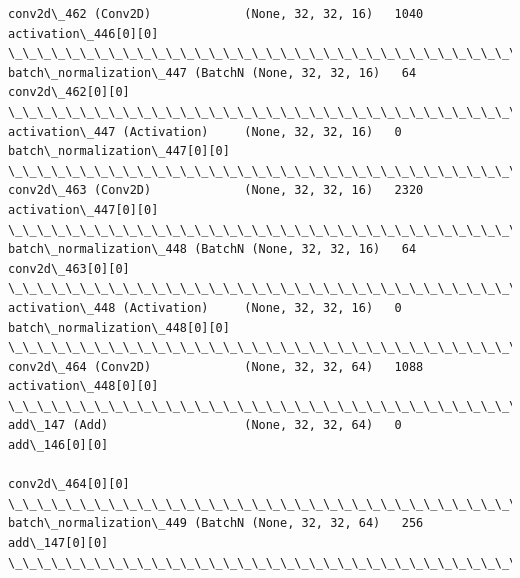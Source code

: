 \documentclass[11pt]{article}
\begin{document}
\begin{Verbatim}[commandchars=\\\{\}]
conv2d\_462 (Conv2D)             (None, 32, 32, 16)   1040        activation\_446[0][0]             
\_\_\_\_\_\_\_\_\_\_\_\_\_\_\_\_\_\_\_\_\_\_\_\_\_\_\_\_\_\_\_\_\_\_\_\_\_\_\_\_\_\_\_\_\_\_\_\_\_\_\_\_\_\_\_\_\_\_\_\_\_\_\_\_\_\_\_\_\_\_\_\_\_\_\_\_\_\_\_\_\_\_\_\_\_\_\_\_\_\_\_\_\_\_\_\_\_\_
batch\_normalization\_447 (BatchN (None, 32, 32, 16)   64          conv2d\_462[0][0]                 
\_\_\_\_\_\_\_\_\_\_\_\_\_\_\_\_\_\_\_\_\_\_\_\_\_\_\_\_\_\_\_\_\_\_\_\_\_\_\_\_\_\_\_\_\_\_\_\_\_\_\_\_\_\_\_\_\_\_\_\_\_\_\_\_\_\_\_\_\_\_\_\_\_\_\_\_\_\_\_\_\_\_\_\_\_\_\_\_\_\_\_\_\_\_\_\_\_\_
activation\_447 (Activation)     (None, 32, 32, 16)   0           batch\_normalization\_447[0][0]    
\_\_\_\_\_\_\_\_\_\_\_\_\_\_\_\_\_\_\_\_\_\_\_\_\_\_\_\_\_\_\_\_\_\_\_\_\_\_\_\_\_\_\_\_\_\_\_\_\_\_\_\_\_\_\_\_\_\_\_\_\_\_\_\_\_\_\_\_\_\_\_\_\_\_\_\_\_\_\_\_\_\_\_\_\_\_\_\_\_\_\_\_\_\_\_\_\_\_
conv2d\_463 (Conv2D)             (None, 32, 32, 16)   2320        activation\_447[0][0]             
\_\_\_\_\_\_\_\_\_\_\_\_\_\_\_\_\_\_\_\_\_\_\_\_\_\_\_\_\_\_\_\_\_\_\_\_\_\_\_\_\_\_\_\_\_\_\_\_\_\_\_\_\_\_\_\_\_\_\_\_\_\_\_\_\_\_\_\_\_\_\_\_\_\_\_\_\_\_\_\_\_\_\_\_\_\_\_\_\_\_\_\_\_\_\_\_\_\_
batch\_normalization\_448 (BatchN (None, 32, 32, 16)   64          conv2d\_463[0][0]                 
\_\_\_\_\_\_\_\_\_\_\_\_\_\_\_\_\_\_\_\_\_\_\_\_\_\_\_\_\_\_\_\_\_\_\_\_\_\_\_\_\_\_\_\_\_\_\_\_\_\_\_\_\_\_\_\_\_\_\_\_\_\_\_\_\_\_\_\_\_\_\_\_\_\_\_\_\_\_\_\_\_\_\_\_\_\_\_\_\_\_\_\_\_\_\_\_\_\_
activation\_448 (Activation)     (None, 32, 32, 16)   0           batch\_normalization\_448[0][0]    
\_\_\_\_\_\_\_\_\_\_\_\_\_\_\_\_\_\_\_\_\_\_\_\_\_\_\_\_\_\_\_\_\_\_\_\_\_\_\_\_\_\_\_\_\_\_\_\_\_\_\_\_\_\_\_\_\_\_\_\_\_\_\_\_\_\_\_\_\_\_\_\_\_\_\_\_\_\_\_\_\_\_\_\_\_\_\_\_\_\_\_\_\_\_\_\_\_\_
conv2d\_464 (Conv2D)             (None, 32, 32, 64)   1088        activation\_448[0][0]             
\_\_\_\_\_\_\_\_\_\_\_\_\_\_\_\_\_\_\_\_\_\_\_\_\_\_\_\_\_\_\_\_\_\_\_\_\_\_\_\_\_\_\_\_\_\_\_\_\_\_\_\_\_\_\_\_\_\_\_\_\_\_\_\_\_\_\_\_\_\_\_\_\_\_\_\_\_\_\_\_\_\_\_\_\_\_\_\_\_\_\_\_\_\_\_\_\_\_
add\_147 (Add)                   (None, 32, 32, 64)   0           add\_146[0][0]                    
                                                                 conv2d\_464[0][0]                 
\_\_\_\_\_\_\_\_\_\_\_\_\_\_\_\_\_\_\_\_\_\_\_\_\_\_\_\_\_\_\_\_\_\_\_\_\_\_\_\_\_\_\_\_\_\_\_\_\_\_\_\_\_\_\_\_\_\_\_\_\_\_\_\_\_\_\_\_\_\_\_\_\_\_\_\_\_\_\_\_\_\_\_\_\_\_\_\_\_\_\_\_\_\_\_\_\_\_
batch\_normalization\_449 (BatchN (None, 32, 32, 64)   256         add\_147[0][0]                    
\_\_\_\_\_\_\_\_\_\_\_\_\_\_\_\_\_\_\_\_\_\_\_\_\_\_\_\_\_\_\_\_\_\_\_\_\_\_\_\_\_\_\_\_\_\_\_\_\_\_\_\_\_\_\_\_\_\_\_\_\_\_\_\_\_\_\_\_\_\_\_\_\_\_\_\_\_\_\_\_\_\_\_\_\_\_\_\_\_\_\_\_\_\_\_\_\_\_

\end{Verbatim}
\end{document}
